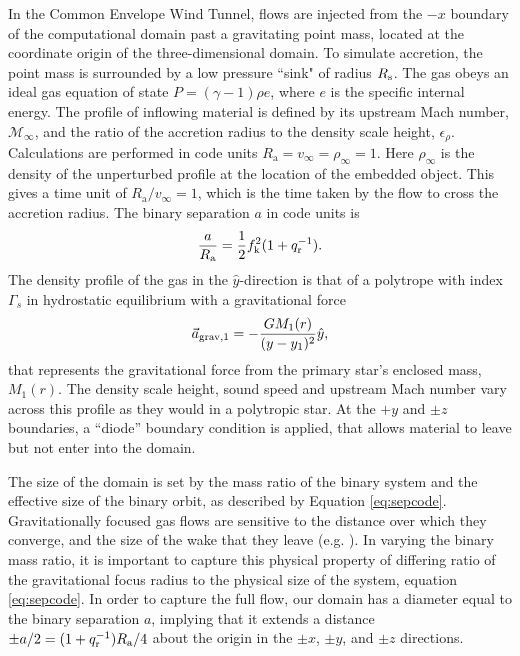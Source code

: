 In the Common Envelope Wind Tunnel, flows are injected from the $-x$ boundary of the computational domain past a gravitating point mass, located at the coordinate origin of the three-dimensional domain.  To simulate accretion, the point mass is surrounded by a low pressure ``sink" of radius $R_{\rm s}$. The gas obeys an ideal gas equation of state $P=(\gamma-1)\rho e$, where $e$ is the specific internal energy. The profile of inflowing material is defined by its upstream Mach number, $\mathcal M_\infty$, and the ratio of the accretion radius to the density scale height, $\epsilon_\rho$.  Calculations are performed in code units $R_{\mathrm{a}} = v_\infty = \rho_\infty = 1$. Here $\rho_\infty$ is the density of the unperturbed profile at the location of the embedded object. This gives a time unit of $R_{\mathrm{a}}/v_\infty = 1$, which is the time taken by the flow to cross the accretion radius. The binary separation $a$ in code units is
\begin{equation}\label{eq:sepcode}
\frac{a}{R_{\rm a}} = \frac{1}{2}f_{\rm k}^2 (1 + q_{\rm r}^{-1}) .
\end{equation}
The density profile of the gas in the $\hat y$-direction is that of a polytrope with index $\Gamma_s$ in hydrostatic equilibrium with a gravitational force 
\begin{equation}
\vec{a}_{\rm grav, 1} = -\frac{GM_1(r)}{(y - y_1)^2}\hat{y},
\end{equation}
that represents the gravitational force from the primary star's enclosed mass, $M_1 (r)$. The density scale height, sound speed and upstream Mach number vary across this profile as they would in a polytropic star.  At the $+y$ and $\pm z$ boundaries, a ``diode'' boundary condition is applied, that allows material to leave but not enter into the domain. 


The size of the domain is set by the mass ratio of the binary system and the effective size of the binary orbit, as described by Equation \eqref{eq:sepcode}. Gravitationally focused gas flows are sensitive to the distance over which they converge, and the size of the wake that they leave (e.g. \cite{1999ApJ...513..252O}). In varying the binary mass ratio, it is important to capture this physical property of differing ratio of the gravitational focus radius to the physical size of the system, equation \eqref{eq:sepcode}. In order to capture the full flow, our domain has a diameter equal to the binary separation $a$, implying that it extends a distance $\pm a/2 =  (1 + q_{\rm r}^{-1}) R_{\mathrm{a}}/4$ about the origin in the $\pm x$, $\pm y$, and $\pm z$ directions. 
  

